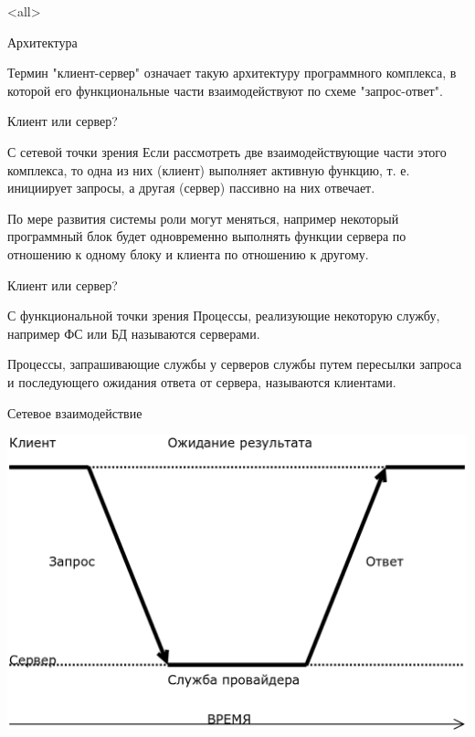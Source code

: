 

\subtitle{Модель сетевого взаимодействия клиент-сервер}



\mode<all>{}

%
%

\begin{frame}{Архитектура}

	Термин "клиент-сервер" означает такую архитектуру программного комплекса, 
в которой его функциональные части взаимодействуют по схеме "запрос-ответ". 
\end{frame}

\begin{frame}{Клиент или сервер?}
	
	\begin{block}{С сетевой точки зрения}
Если рассмотреть две взаимодействующие части этого комплекса,  то одна из них (клиент) выполняет активную функцию,  т. е. инициирует запросы,  а другая (сервер) пассивно на них отвечает.
	\end{block}
По мере развития системы роли могут меняться,  например некоторый программный блок будет одновременно выполнять функции сервера по отношению к одному блоку и клиента по отношению к другому.
\end{frame}

\begin{frame}{Клиент или сервер?}

	\begin{block}{С функциональной точки зрения}
Процессы,  реализующие некоторую службу,  например ФС или БД называются серверами. 

Процессы,  запрашивающие службы у серверов службы путем пересылки запроса и последующего ожидания ответа от сервера,  называются клиентами.
	\end{block}
\end{frame}

\begin{frame}{Сетевое взаимодействие}
	\begin{center}
		\includegraphics[height=0.8\textheight]{07-cs_arch.png}
	\end{center}
\end{frame}

